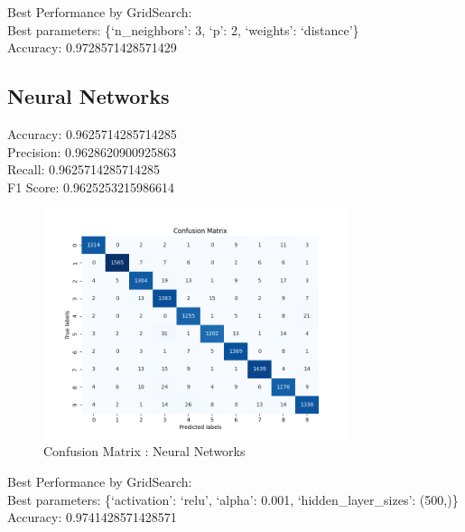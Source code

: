 \documentclass{assignmeownt}
\begin{document}
Best Performance by GridSearch:\\
Best parameters: \{`n\_neighbors': 3, `p': 2, `weights': `distance'\}\\
Accuracy: 0.9728571428571429\\
\clearpage
\subsection{Neural Networks}
Accuracy: 0.9625714285714285 \\
Precision: 0.9628620900925863 \\
Recall: 0.9625714285714285 \\
F1 Score: 0.9625253215986614 \\
\begin{figure}[H]
    \centering
    \includegraphics[width=0.8\textwidth]{images/nnConMat.png}
    \caption{Confusion Matrix : Neural Networks}
    \label{fig:1}
\end{figure}

Best Performance by GridSearch:\\
Best parameters: \{`activation': `relu', `alpha': 0.001, `hidden\_layer\_sizes': (500,)\}\\
Accuracy: 0.9741428571428571\\

\clearpage
\end{document}
